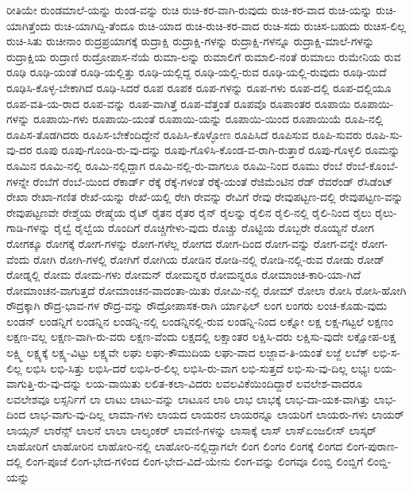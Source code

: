 {ರೀತಿಯೇ
ರುಂಡಮಾಲೆ-ಯನ್ನು
ರುಂಡ-ವನ್ನು
ರುಚಿ
ರುಚಿ-ಕರ-ವಾಗಿ-ರುವುದು
ರುಚಿ-ಕರ-ವಾದ
ರುಚಿ-ಯನ್ನು
ರುಚಿ-ಯಾಗಿತ್ತೆಂದು
ರುಚಿ-ಯಾಗಿದ್ದಿ-ತೆಂದೂ
ರುಚಿ-ಯಾದ
ರುಚಿ-ರುಚಿ-ಕರ-ವಾದ
ರುಚಿ-ಸದು
ರುಚಿಸ-ಬಹುದು
ರುಚಿಸ-ಲಿಲ್ಲ
ರುಚಿ-ಸಿತು
ರುಚೀನಾಂ
ರುದ್ರಪ್ರಯಾಗಕ್ಕೆ
ರುದ್ರಾಕ್ಷಿ
ರುದ್ರಾಕ್ಷಿ-ಗಳನ್ನು
ರುದ್ರಾಕ್ಷಿ-ಗಳನ್ನೂ
ರುದ್ರಾಕ್ಷಿ-ಮಾಲೆ-ಗಳನ್ನು
ರುದ್ರಾಕ್ಷಿಯ
ರುದ್ರಾಣಿ
ರುದ್ರೋಪಾಸ-ನೆಯೆ
ರುಮಾ-ಲನ್ನು
ರುಮಾಲಿಗೆ
ರುಮಾಲಿ-ನಂತೆ
ರುಮಾಲು
ರುಮೇನಿಯ
ರುವ
ರೂಢಿ
ರೂಢಿ-ಯಂತೆ
ರೂಢಿ-ಯಲ್ಲಿತ್ತು
ರೂಢಿ-ಯಲ್ಲಿದ್ದ
ರೂಢಿ-ಯಲ್ಲಿ-ರುವ
ರೂಢಿ-ಯಲ್ಲಿ-ರುವುದು
ರೂಢಿ-ಯಿದೆ
ರೂಢಿಸಿ-ಕೊಳ್ಳ-ಬೇಕಾಗಿದೆ
ರೂಢಿ-ಸಿದರೆ
ರೂಪ
ರೂಪಕ
ರೂಪ-ಗಳನ್ನು
ರೂಪ-ಗಳು
ರೂಪ-ದಲ್ಲಿ
ರೂಪ-ದಲ್ಲಿಯೂ
ರೂಪ-ವತಿ-ಯ-ರಾದ
ರೂಪ-ವನ್ನು
ರೂಪ-ವಾಗಿತ್ತೆ
ರೂಪ-ವೆತ್ತಂತೆ
ರೂಪವೊ
ರೂಪಾಂತರ
ರೂಪಾಯಿ
ರೂಪಾಯಿ-ಗಳನ್ನು
ರೂಪಾಯಿ-ಗಳು
ರೂಪಾಯಿ-ಯಂತೆ
ರೂಪಾಯಿ-ಯನ್ನು
ರೂಪಾಯಿ-ಯಿಂದ
ರೂಪಾಯಿಯೆ
ರೂಪಿ-ನಲ್ಲಿ
ರೂಪಿಸ-ತೊಡಗಿದರು
ರೂಪಿಸ-ಬೇಕೆಂದಿದ್ದೇನೆ
ರೂಪಿಸಿ-ಕೊಳ್ಳೋಣ
ರೂಪಿಸಿದೆ
ರೂಪಿಸುವ
ರೂಪಿ-ಸುವರು
ರೂಪಿ-ಸು-ವು-ದರ
ರೂಪು
ರೂಪು-ಗೊಂಡಿ-ರು-ವು-ದನ್ನು
ರೂಪು-ಗೊಳಿಸಿ-ಕೊಂಡ-ವ-ರಾಗಿ-ರುತ್ತಾರೆ
ರೂಪು-ಗೊಳ್ಳಲಿ
ರೂಮನ್ನು
ರೂಮಿನ
ರೂಮಿ-ನಲ್ಲಿ
ರೂಮಿ-ನಲ್ಲಿದ್ದಾಗ
ರೂಮಿ-ನಲ್ಲಿ-ರು-ವಾಗಲೂ
ರೂಮಿ-ನಿಂದ
ರೂಮು
ರೆಂಬೆ
ರೆಂಬೆ-ಕೊಂಬೆ-ಗಳನ್ನೇ
ರೆಂಬೆಗೆ
ರೆಂಬೆ-ಯಿಂದ
ರೆಕಾರ್ಡ್
ರೆಕ್ಕೆ
ರೆಕ್ಕೆ-ಗಳಂತೆ
ರೆಕ್ಕೆ-ಯಂತೆ
ರೆಜಿಮೆಂಟಿನ
ರೆಡ್
ರೆವರೆಂಡ್
ರೆಸಿಡೆಂಟ್
ರೇಖಾ
ರೇಖಾ-ಗಣಿತ
ರೇಖೆ-ಯನ್ನು
ರೇಖೆ-ಯಲ್ಲಿ
ರೇಗಿ
ರೇವನ್ನು
ರೇವಿಗೆ
ರೇವು
ರೇವುಪಟ್ಟಣ-ದಲ್ಲಿ
ರೇವುಪಟ್ಟಣ-ವನ್ನು
ರೇವುಪಟ್ಟಣವೇ
ರೇಶ್ಮೆಯ
ರೇಷ್ಮೆಯ
ರೈಟ್
ರೈತನ
ರೈತರ
ರೈನ್
ರೈಲನ್ನು
ರೈಲಿನ
ರೈಲಿ-ನಲ್ಲಿ
ರೈಲಿ-ನಿಂದ
ರೈಲು
ರೈಲು-ಗಾಡಿ-ಗಳನ್ನು
ರೈಲ್ವೆ
ರೈಲ್ವೆಯ
ರೊಂದಿಗೆ
ರೊಚ್ಚಿಗೇಳು-ವುದು
ರೊಚ್ಚು
ರೊಟ್ಟಿಯ
ರೊಬ್ಬರೇ
ರೊಯ್ಯನೆ
ರೋಗ
ರೋಗಕ್ಕೂ
ರೋಗಕ್ಕೆ
ರೋಗ-ಗಳನ್ನು
ರೋಗ-ಗಳೆಲ್ಲ
ರೋಗದ
ರೋಗ-ದಿಂದ
ರೋಗ-ವನ್ನು
ರೋಗ-ವನ್ನೇ
ರೋಗ-ವೆಂದು
ರೋಗಿ
ರೋಗಿ-ಗಳಲ್ಲಿ
ರೋಗಿಗೆ
ರೋಗಿಯ
ರೋಡಿನ
ರೋಡಿ-ನಲ್ಲಿ
ರೋಡಿ-ನಲ್ಲಿ-ರುವ
ರೋಡು
ರೋಡ್
ರೋಡ್ನಲ್ಲಿ
ರೋಮ
ರೋಮ-ಗಳು
ರೋಮನ್
ರೋಮನ್ನರ
ರೋಮನ್ನರೂ
ರೋಮಾಂಚ-ಕಾರಿ-ಯಾ-ಗಿದೆ
ರೋಮಾಂಚನ-ವಾಗುತ್ತದೆ
ರೋಮಾಂಚನ-ವಾದಂತಾ-ಯಿತು
ರೋಮಿ-ನಲ್ಲಿ
ರೋಮ್
ರೋಲಾ
ರೋಸಿ
ರೋಸಿ-ಹೋಗಿ
ರೌದ್ರಕ್ಕಾಗಿ
ರೌದ್ರ-ಭಾವ-ಗಳ
ರೌದ್ರ-ವನ್ನು
ರೌದ್ರೋಪಾಸಕ-ರಾಗಿ
ರ್ಯಾಫಿಲ್
ಲಂಗ
ಲಂಗರು
ಲಂಚ-ಕೊಡು-ವುದು
ಲಂಡನ್
ಲಂಡನ್ನಿಗೆ
ಲಂಡನ್ನಿನ
ಲಂಡನ್ನಿ-ನಲ್ಲಿ
ಲಂಡನ್ನಿನಲ್ಲಿ-ರುವ
ಲಂಡನ್ನಿ-ನಿಂದ
ಲಕ್ನೋ
ಲಕ್ಷ
ಲಕ್ಷ-ಗಟ್ಟಲೆ
ಲಕ್ಷಣಂ
ಲಕ್ಷಣ-ವಲ್ಲ
ಲಕ್ಷಣ-ವಾಗಿ-ರು-ವರು
ಲಕ್ಷಣ-ವೆಂದು
ಲಕ್ಷದಲ್ಲಿ
ಲಕ್ಷಾಂತರ
ಲಕ್ಷಿಸಿ-ದರು
ಲಕ್ಷಿಸು-ವುದೇ
ಲಕ್ಷೋಪ-ಲಕ್ಷ
ಲಕ್ಷ್ಮಿ
ಲಕ್ಷ್ಯಕ್ಕೆ
ಲಕ್ಷ್ಯ-ವಿಟ್ಟು
ಲಕ್ಷ್ಯವೇ
ಲಘು
ಲಘು-ಕೌಮುದಿಯ
ಲಘು-ವಾದ
ಲಜ್ಜಾವ-ತಿ-ಯಂತೆ
ಲಜ್ಜೆ
ಲಬೆಕ್
ಲಭಿ-ಸ-ಲಿಲ್ಲ
ಲಭಿಸಿ
ಲಭಿ-ಸಿತ್ತು
ಲಭಿಸಿ-ದರೆ
ಲಭಿಸಿ-ರ-ಲಿಲ್ಲ
ಲಭಿಸಿ-ರು-ವಾಗ
ಲಭಿ-ಸುತ್ತದೆ
ಲಭಿ-ಸು-ವು-ದಿಲ್ಲ
ಲಭ್ಯಃ
ಲಯ-ವಾಗುತ್ತಿ-ರು-ವು-ದನ್ನು
ಲಯ-ವಾಯಿತು
ಲಲಿತ-ಕಲಾ-ವಿದರು
ಲವಲವಿಕೆಯಿಂದಿದ್ದಾರೆ
ಲವಲೇಶ-ವಾದರೂ
ಲವಲೇಶವೂ
ಲಸ್ಸರ್ನಿಗೆ
ಲಾ
ಲಾಟು
ಲಾಟು-ವನ್ನು
ಲಾಟೂನ
ಲಾಠಿ
ಲಾಭ
ಲಾಭಕ್ಕೆ
ಲಾಭ-ದಾ-ಯಕ-ವಾಗಿತ್ತು
ಲಾಭ-ದಿಂದ
ಲಾಭ-ವಾಗು-ವು-ದಿಲ್ಲ
ಲಾಮಾ-ಗಳು
ಲಾಯದ
ಲಾಯರನ
ಲಾಯರನ್ನೂ
ಲಾಯರಿಗೆ
ಲಾಯರು-ಗಳು
ಲಾಯರ್
ಲಾಯ್ಸನ್
ಲಾರೆನ್ಸ್
ಲಾಲನೆ
ಲಾಲಾ
ಲಾಲ್ಶಂಕರ್
ಲಾವಣಿ-ಗಳನ್ನು
ಲಾಸಾಕ್ಕೆ
ಲಾಸ್
ಲಾಸ್ಏಂಜಲೀಸ್
ಲಾಸ್ಕರ್
ಲಾಹೋರಿಗೆ
ಲಾಹೋರಿನ
ಲಾಹೋರಿ-ನಲ್ಲಿ
ಲಾಹೋರಿ-ನಲ್ಲಿದ್ದಾಗಲೇ
ಲಿಂಗ
ಲಿಂಗಂ
ಲಿಂಗಕ್ಕೆ
ಲಿಂಗದ
ಲಿಂಗ-ಪುರಾಣ-ದಲ್ಲಿ
ಲಿಂಗ-ಪೂಜೆ
ಲಿಂಗ-ಭೇದ-ಗಳಿಂದ
ಲಿಂಗ-ಭೇದ-ವಿದೆ-ಯೇನು
ಲಿಂಗ-ವನ್ನು
ಲಿಂಗವೂ
ಲಿಂಬ್ಡಿ
ಲಿಂಬ್ಡಿಗೆ
ಲಿಂಬ್ಡಿ-ಯನ್ನು
}
